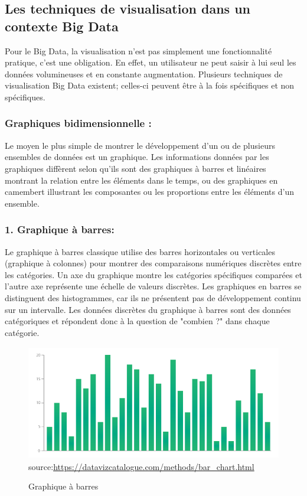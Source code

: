 \documentclass[french, a4paper, 12pt]{report}
\begin{document}
\subsection{Les techniques de visualisation dans un contexte Big Data }
Pour le Big Data, la visualisation n’est pas simplement une fonctionnalité pratique, c’est une obligation. En effet, un utilisateur ne peut saisir à lui seul les données volumineuses et en constante augmentation. Plusieurs techniques de visualisation Big Data existent; celles-ci peuvent être à la fois spécifiques et non spécifiques.
\subsubsection{Graphiques bidimensionnelle :}
Le moyen le plus simple de montrer le développement d'un ou de plusieurs ensembles de données est un graphique. Les informations données par les graphiques diffèrent selon qu’ils sont des graphiques à barres et linéaires montrant la relation entre les éléments dans le temps, ou des graphiques en camembert illustrant les composantes ou les proportions entre les éléments d'un ensemble.
\subsubsection{1. Graphique à barres:}
Le graphique à barres classique utilise des barres horizontales ou verticales (graphique à colonnes) pour montrer des comparaisons numériques discrètes entre les catégories. Un axe du graphique montre les catégories spécifiques comparées et l'autre axe représente une échelle de valeurs discrètes.
Les graphiques en barres se distinguent des histogrammes, car ils ne présentent pas de développement continu sur un intervalle. Les données discrètes du graphique à barres sont des données catégoriques et répondent donc à la question de "combien ?" dans chaque catégorie.

\begin{figure}[!ht]
    \centering
    \includegraphics[height=5cm]{images/bar_chart.png}
    \scriptsize{source:\url{https://datavizcatalogue.com/methods/bar_chart.html}}
    \caption{Graphique à barres}
    \label{fig:1.3}
\end{figure}
\end{document}
